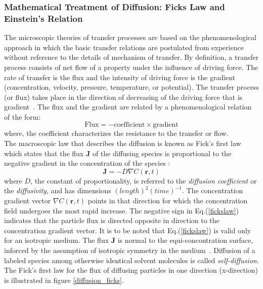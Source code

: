     \subsubsection{Mathematical Treatment of Diffusion: Ficks Law and Einstein's Relation}
   The microscopic theories of transfer processes are based on the phenomenological approach in which the basic transfer relations are postulated from experience without reference to the details of mechanism of transfer. By definition, a transfer process  consists of net flow of a property under the influence of driving force. The rate of transfer is the flux and the intensity of driving force is the  gradient (concentration, velocity, pressure, temperature, or potential). The 
   transfer process (or flux) takes place in the direction of decreasing of the driving force that is gradient~\citep{bird2002}. The flux and the gradient are related by a phenomenological relation of the form:
   \begin{equation}
   \mathrm{Flux} = -\mathrm{coefficient} \times \mathrm{gradient}
   \end{equation}
   where, the coefficient characterizes the resistance to the transfer or flow.\\
    The macroscopic law that describes the diffusion is known as  Fick's first law which states that the flux  $\mathbf{J}$ of the diffusing species is proportional to the negative gradient in the concentration of the species \citep{Frenkel2002}: 
    \begin{equation}
    \label{fickslaw}
    \mathbf{J} = -D\nabla C(\mathbf{r},t)
    \end{equation}      	  						     	 	          
    where  $D$, the constant of proportionality, is referred to the \textit{diffusion coefficient} or the \emph{diffusivity}, and has dimensions $(length)^ 2 (time)^{-1}$. The concentration gradient vector $\nabla C(\textbf{r},t)$ points in that direction for which the concentration field undergoes the most rapid increase. The negative sign in Eq.(\ref{fickslaw}) indicates that the particle flux is directed opposite in direction to the concentration gradient vector. It is to be noted  that Eq.(\ref{fickslaw}) is valid only for an isotropic medium. The flux $\textbf{J}$ is normal to the equi-concontration surface, inforced by the assumption of isotropic symmetry in the medium~\citep{crank1979}. Diffusion of a labeled species among otherwise identical solvent molecules is called \textit{self-diffusion.} The Fick’s first law for the flux of diffusing particles in one direction (x-direction) is illustrated in figure \ref{diffusion_ficks}.
